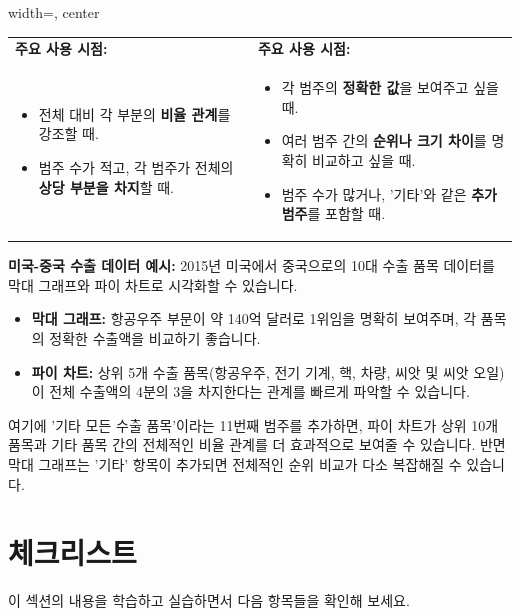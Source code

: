 \documentclass[11pt,a4paper]{article}
\theoremstyle{definition}
\begin{document}
\begin{adjustbox}{width=\textwidth, center}
\begin{tabular}{p{}p{}}
\\
\textbf{주요 사용 시점:} & \textbf{주요 사용 시점:} \\
\begin{itemize}
    \item 전체 대비 각 부분의 \textbf{비율 관계}를 강조할 때.
    \item 범주 수가 적고, 각 범주가 전체의 \textbf{상당 부분을 차지}할 때.
\end{itemize}
&
\begin{itemize}
    \item 각 범주의 \textbf{정확한 값}을 보여주고 싶을 때.
    \item 여러 범주 간의 \textbf{순위나 크기 차이}를 명확히 비교하고 싶을 때.
    \item 범주 수가 많거나, '기타'와 같은 \textbf{추가 범주}를 포함할 때.
\end{itemize}
\\
\bottomrule
\end{tabular}
\end{adjustbox}

\begin{examplebox}
\textbf{미국-중국 수출 데이터 예시:}
2015년 미국에서 중국으로의 10대 수출 품목 데이터를 막대 그래프와 파이 차트로 시각화할 수 있습니다.
\begin{itemize}
    \item \textbf{막대 그래프:} 항공우주 부문이 약 140억 달러로 1위임을 명확히 보여주며, 각 품목의 정확한 수출액을 비교하기 좋습니다.
    \item \textbf{파이 차트:} 상위 5개 수출 품목(항공우주, 전기 기계, 핵, 차량, 씨앗 및 씨앗 오일)이 전체 수출액의 4분의 3을 차지한다는 관계를 빠르게 파악할 수 있습니다.
\end{itemize}
여기에 '기타 모든 수출 품목'이라는 11번째 범주를 추가하면, 파이 차트가 상위 10개 품목과 기타 품목 간의 전체적인 비율 관계를 더 효과적으로 보여줄 수 있습니다. 반면 막대 그래프는 '기타' 항목이 추가되면 전체적인 순위 비교가 다소 복잡해질 수 있습니다.
\end{examplebox}

\newpage
\section{체크리스트}

이 섹션의 내용을 학습하고 실습하면서 다음 항목들을 확인해 보세요.
\end{document}
